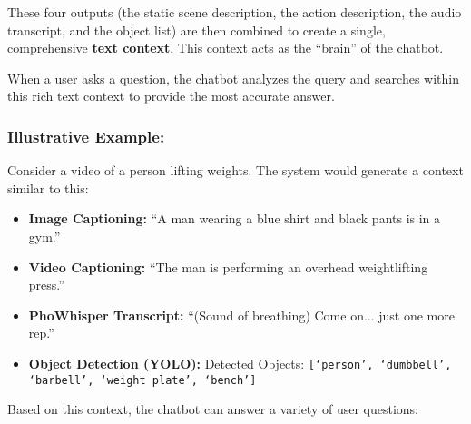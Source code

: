 These four outputs (the static scene description, the action description, the audio transcript, and the object list) are then combined to create a single, comprehensive \textbf{text context}. This context acts as the ``brain'' of the chatbot.

When a user asks a question, the chatbot analyzes the query and searches within this rich text context to provide the most accurate answer.

\subsubsection*{Illustrative Example:}

Consider a video of a person lifting weights. The system would generate a context similar to this:

\begin{itemize}
    \item \textbf{Image Captioning:} ``A man wearing a blue shirt and black pants is in a gym.''

    \item \textbf{Video Captioning:} ``The man is performing an overhead weightlifting press.''

    \item \textbf{PhoWhisper Transcript:} ``(Sound of breathing) Come on... just one more rep.''
    
    \item \textbf{Object Detection (YOLO):} Detected Objects: \texttt{[`person', `dumbbell', `barbell', `weight plate', `bench']}
\end{itemize}

\noindent
Based on this context, the chatbot can answer a variety of user questions:

